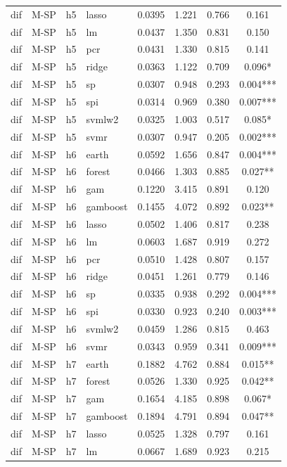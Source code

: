 \begin{ThreePartTable}
\begin{longtable}[t]{llclcccc}
dif & M-SP & h5 & lasso & 0.0395 & 1.221 & 0.766 & 0.161\\
dif & M-SP & h5 & lm & 0.0437 & 1.350 & 0.831 & 0.150\\
dif & M-SP & h5 & pcr & 0.0431 & 1.330 & 0.815 & 0.141\\
dif & M-SP & h5 & ridge & 0.0363 & 1.122 & 0.709 & 0.096*\\
dif & M-SP & h5 & sp & 0.0307 & 0.948 & 0.293 & 0.004***\\
dif & M-SP & h5 & spi & 0.0314 & 0.969 & 0.380 & 0.007***\\
dif & M-SP & h5 & svmlw2 & 0.0325 & 1.003 & 0.517 & 0.085*\\
dif & M-SP & h5 & svmr & 0.0307 & 0.947 & 0.205 & 0.002***\\
\addlinespace
dif & M-SP & h6 & earth & 0.0592 & 1.656 & 0.847 & 0.004***\\
dif & M-SP & h6 & forest & 0.0466 & 1.303 & 0.885 & 0.027**\\
dif & M-SP & h6 & gam & 0.1220 & 3.415 & 0.891 & 0.120\\
dif & M-SP & h6 & gamboost & 0.1455 & 4.072 & 0.892 & 0.023**\\
dif & M-SP & h6 & lasso & 0.0502 & 1.406 & 0.817 & 0.238\\
dif & M-SP & h6 & lm & 0.0603 & 1.687 & 0.919 & 0.272\\
dif & M-SP & h6 & pcr & 0.0510 & 1.428 & 0.807 & 0.157\\
dif & M-SP & h6 & ridge & 0.0451 & 1.261 & 0.779 & 0.146\\
dif & M-SP & h6 & sp & 0.0335 & 0.938 & 0.292 & 0.004***\\
dif & M-SP & h6 & spi & 0.0330 & 0.923 & 0.240 & 0.003***\\
dif & M-SP & h6 & svmlw2 & 0.0459 & 1.286 & 0.815 & 0.463\\
dif & M-SP & h6 & svmr & 0.0343 & 0.959 & 0.341 & 0.009***\\
\addlinespace
dif & M-SP & h7 & earth & 0.1882 & 4.762 & 0.884 & 0.015**\\
dif & M-SP & h7 & forest & 0.0526 & 1.330 & 0.925 & 0.042**\\
dif & M-SP & h7 & gam & 0.1654 & 4.185 & 0.898 & 0.067*\\
dif & M-SP & h7 & gamboost & 0.1894 & 4.791 & 0.894 & 0.047**\\
dif & M-SP & h7 & lasso & 0.0525 & 1.328 & 0.797 & 0.161\\
dif & M-SP & h7 & lm & 0.0667 & 1.689 & 0.923 & 0.215\\

\end{longtable}
\end{ThreePartTable}
